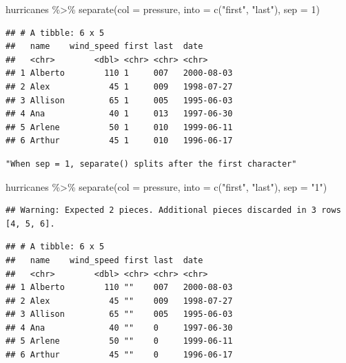 \documentclass[
]{article}
\newenvironment{Shaded}{\begin{snugshade}}{\end{snugshade}}
\newcommand{\AttributeTok}[1]{\textcolor[rgb]{0.77,0.63,0.00}{#1}}
\newcommand{\DecValTok}[1]{\textcolor[rgb]{0.00,0.00,0.81}{#1}}
\newcommand{\FunctionTok}[1]{\textcolor[rgb]{0.00,0.00,0.00}{#1}}
\newcommand{\NormalTok}[1]{#1}
\newcommand{\SpecialCharTok}[1]{\textcolor[rgb]{0.00,0.00,0.00}{#1}}
\newcommand{\StringTok}[1]{\textcolor[rgb]{0.31,0.60,0.02}{#1}}
\begin{document}
\begin{Shaded}
\begin{Highlighting}[]
\NormalTok{hurricanes }\SpecialCharTok{\%\textgreater{}\%} 
  \FunctionTok{separate}\NormalTok{(}\AttributeTok{col =}\NormalTok{ pressure, }\AttributeTok{into =} \FunctionTok{c}\NormalTok{(}\StringTok{"first"}\NormalTok{, }\StringTok{"last"}\NormalTok{), }\AttributeTok{sep =} \DecValTok{1}\NormalTok{)}
\end{Highlighting}
\end{Shaded}

\begin{verbatim}
## # A tibble: 6 x 5
##   name    wind_speed first last  date      
##   <chr>        <dbl> <chr> <chr> <chr>     
## 1 Alberto        110 1     007   2000-08-03
## 2 Alex            45 1     009   1998-07-27
## 3 Allison         65 1     005   1995-06-03
## 4 Ana             40 1     013   1997-06-30
## 5 Arlene          50 1     010   1999-06-11
## 6 Arthur          45 1     010   1996-06-17
\end{verbatim}

\begin{verbatim}
"When sep = 1, separate() splits after the first character"
\end{verbatim}

\begin{Shaded}
\begin{Highlighting}[]
\NormalTok{hurricanes }\SpecialCharTok{\%\textgreater{}\%} 
  \FunctionTok{separate}\NormalTok{(}\AttributeTok{col =}\NormalTok{ pressure, }\AttributeTok{into =} \FunctionTok{c}\NormalTok{(}\StringTok{"first"}\NormalTok{, }\StringTok{"last"}\NormalTok{), }\AttributeTok{sep =} \StringTok{"1"}\NormalTok{)}
\end{Highlighting}
\end{Shaded}

\begin{verbatim}
## Warning: Expected 2 pieces. Additional pieces discarded in 3 rows [4, 5, 6].
\end{verbatim}

\begin{verbatim}
## # A tibble: 6 x 5
##   name    wind_speed first last  date      
##   <chr>        <dbl> <chr> <chr> <chr>     
## 1 Alberto        110 ""    007   2000-08-03
## 2 Alex            45 ""    009   1998-07-27
## 3 Allison         65 ""    005   1995-06-03
## 4 Ana             40 ""    0     1997-06-30
## 5 Arlene          50 ""    0     1999-06-11
## 6 Arthur          45 ""    0     1996-06-17
\end{verbatim}
\end{document}
